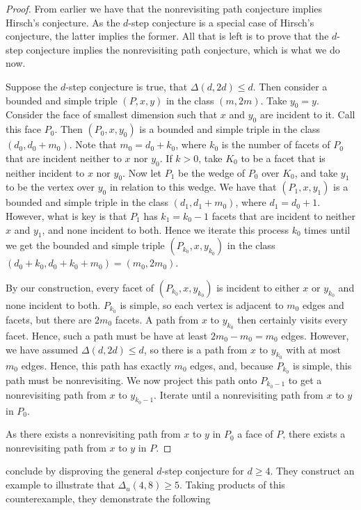 \documentclass[11pt,a4paper]{article}
\theoremstyle{definition}
\begin{document}
\begin{proof}
From earlier we have that the nonrevisiting path conjecture implies Hirsch's conjecture. As the $d$-step conjecture is a special case of Hirsch's conjecture, the latter implies the former. All that is left is to prove that the $d$-step conjecture implies the nonrevisiting path conjecture, which is what we do now.

Suppose the $d$-step conjecture is true, that $\Delta(d,2d)\le d$. Then consider a bounded and simple triple $(P,x,y)$ in the class $(m,2m)$. Take $y_0=y$. Consider the face of smallest dimension such that $x$ and $y_0$ are incident to it. Call this face $P_0$. Then $(P_0,x,y_0)$ is a bounded and simple triple in the class $(d_0,d_0+m_0)$. Note that $m_0=d_0+k_0$, where $k_0$ is the number of facets of $P_0$ that are incident neither to $x$ nor $y_0$. If $k>0$, take $K_0$ to be a facet that is neither incident to $x$ nor $y_0$. Now let $P_1$ be the wedge of $P_0$ over $K_0$, and take $y_1$ to be the vertex over $y_0$ in relation to this wedge. We have that $(P_1,x,y_1)$ is a bounded and simple triple in the class $(d_1,d_1+m_0)$, where $d_1=d_0+1$. However, what is key is that $P_1$ has $k_1=k_0-1$ facets that are incident to neither $x$ and $y_1$, and none incident to both. Hence we iterate this process $k_0$ times until we get the bounded and simple triple $(P_{k_0},x,y_{k_0})$ in the class $(d_0+k_0,d_0+k_0+m_0) = (m_0,2m_0)$. 

By our construction, every facet of $(P_{k_0},x,y_{k_0})$ is incident to either $x$ or $y_{k_0}$ and none incident to both. $P_{k_0}$ is simple, so each vertex is adjacent to $m_0$ edges and facets, but there are $2m_0$ facets. A path from $x$ to $y_{k_0}$ then certainly visits every facet. Hence, such a path must be have at least $2m_0-m_0=m_0$ edges. However, we have assumed $\Delta(d,2d)\le d$, so there is a path from $x$ to $y_{k_0}$ with at most $m_0$ edges. Hence, this path has exactly $m_0$ edges, and, because $P_{k_0}$ is simple, this path must be nonrevisiting. We now project this path onto $P_{k_0-1}$ to get a nonrevisiting path from $x$ to $y_{k_0-1}$. Iterate until a nonrevisiting path from $x$ to $y$ in $P_0$.

As there exists a nonrevisiting path from $x$ to $y$ in $P_0$ a face of $P$, there exists a nonrevisiting path from $x$ to $y$ in $P$.
\end{proof}
\citet{klee67} conclude by disproving the general $d$-step conjecture for $d\ge 4$. They construct an example to illustrate that $\Delta_u(4,8)\ge 5$. Taking products of this counterexample, they demonstrate the following
\end{document}
